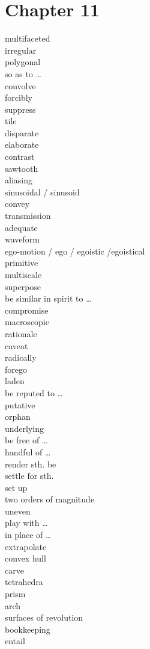 \documentclass[12pt]{article}
\begin{document}
\section{Chapter 11}
multifaceted \\
irregular \\
polygonal \\
so as to \dots\\
convolve \\
forcibly \\
suppress \\
tile \\
disparate \\
elaborate \\
contrast \\
sawtooth \\
aliasing \\
sinusoidal / sinusoid \\
convey \\
transmission \\
adequate \\
waveform \\
ego-motion / ego / egoistic /egoistical \\
primitive \\
multiscale \\
superpose \\
be similar in spirit to \dots \\
compromise \\
macroscopic \\
rationale \\
caveat \\
radically \\
forego \\
laden \\
be reputed to \dots \\
putative \\
orphan \\
underlying \\
be free of \dots \\
handful of \dots \\
render sth. be \\
settle for sth. \\
set up \\
two orders of magnitude \\
uneven \\
play with \dots \\
in place of \dots \\
extrapolate \\
convex hull \\
carve \\
tetrahedra \\
prism \\
arch \\
surfaces of revolution \\
bookkeeping \\
entail \\
\end{document}
